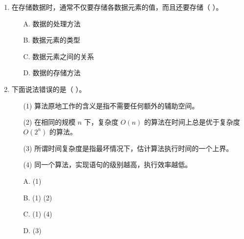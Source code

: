 \documentclass[12pt, a4paper]{article}
\begin{document}
\begin{enumerate}
    \item 在存储数据时，通常不仅要存储各数据元素的值，而且还要存储（ ）。
    \begin{enumerate}
        \item[A.] 数据的处理方法
        \item[B.] 数据元素的类型
        \item[C.] 数据元素之间的关系
        \item[D.] 数据的存储方法
    \end{enumerate}
    
    \item 下面说法错误的是（ ）。
    \begin{enumerate}
        \item[(1)] 算法原地工作的含义是指不需要任何额外的辅助空间。
        \item[(2)] 在相同的规模 $n$ 下，复杂度 $O(n)$ 的算法在时间上总是优于复杂度 $O(2^n)$ 的算法。
        \item[(3)] 所谓时间复杂度是指最坏情况下，估计算法执行时间的一个上界。
        \item[(4)] 同一个算法，实现语句的级别越高，执行效率越低。
        \item[A.] (1)
        \item[B.] (1) (2)
        \item[C.] (1) (4)
        \item[D.] (3)
    \end{enumerate}
\end{enumerate}
\end{document}
